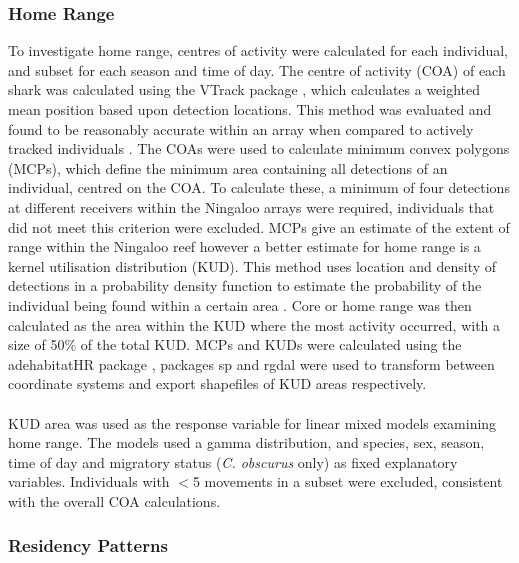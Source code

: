 \documentclass[11pt,a4paper]{article}
\begin{document}
	
	\subsubsection{Home Range}
	
	To investigate home range, centres of activity were calculated for each individual, and subset for each season and time of day. The centre of activity (COA) of each shark was calculated using the VTrack package \citep{Campbell2012}, which calculates a weighted mean position based upon detection locations. This method was evaluated and found to be reasonably accurate within an array when compared to actively tracked individuals \citep{Simpfendorfer2002}. The COAs were used to calculate minimum convex polygons (MCPs), which define the minimum area containing all detections of an individual, centred on the COA. To calculate these, a minimum of four detections at different receivers within the Ningaloo arrays were required, individuals that did not meet this criterion were excluded. MCPs give an estimate of the extent of range within the Ningaloo reef however a better estimate for home range is a kernel utilisation distribution (KUD). This method uses location and density of detections in a probability density function to estimate the probability of the individual being found within a certain area \citep{Jacoby2016}. Core or home range was then calculated as the area within the KUD where the most activity occurred, with a size of 50\% of the total KUD. MCPs and KUDs were calculated using the adehabitatHR package \citep{Calenge2006}, packages sp \citep{Pebesma2005,Bivand2013} and rgdal \citep{Bivand2019} were used to transform between coordinate systems and export shapefiles of KUD areas respectively. \\
	\\
	KUD area was used as the response variable for linear mixed models examining home range. The models used a gamma distribution, and species, sex, season, time of day and migratory status (\textit{C. obscurus} only) as fixed explanatory variables. Individuals with $<$5 movements in a subset were excluded, consistent with the overall COA calculations.\\
	
	
	\subsubsection{Residency Patterns}
	
\end{document}
